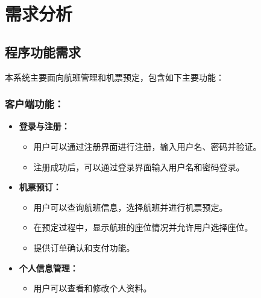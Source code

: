 \documentclass[UTF8, a4paper,12pt]{ctexart}
\begin{document}
\tableofcontents

\newpage

\section{需求分析}

\subsection{程序功能需求}
本系统主要面向航班管理和机票预定，包含如下主要功能：

\subsubsection{客户端功能：}
\begin{itemize}
    \item \textbf{登录与注册：}
    \begin{itemize}
        \item 用户可以通过注册界面进行注册，输入用户名、密码并验证。
        \item 注册成功后，可以通过登录界面输入用户名和密码登录。
    \end{itemize}
    
    \item \textbf{机票预订：}
    \begin{itemize}
        \item 用户可以查询航班信息，选择航班并进行机票预定。
        \item 在预定过程中，显示航班的座位情况并允许用户选择座位。
        \item 提供订单确认和支付功能。
    \end{itemize}

    \item \textbf{个人信息管理：}
    \begin{itemize}
        \item 用户可以查看和修改个人资料。
    \end{itemize}
\end{itemize}
\end{document}
